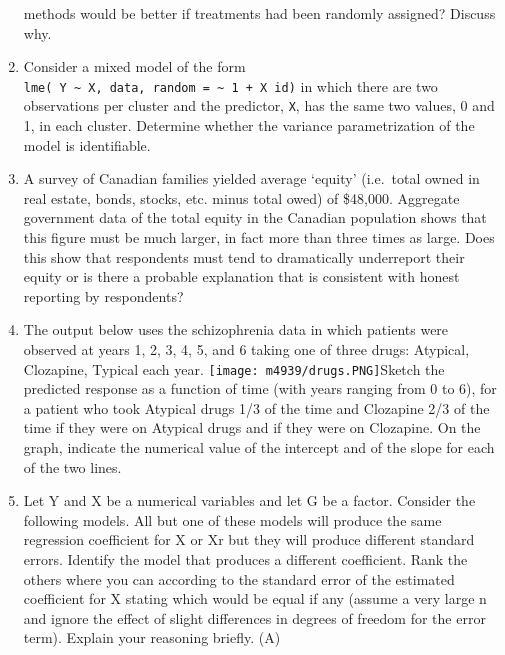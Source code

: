 \documentclass[
]{article}
\begin{document}
\begin{enumerate}
  methods would be better if treatments had been randomly assigned?
  Discuss why. \vspace{0px}
\item
  Consider a mixed model of the form
  \texttt{lme(\ Y\ \textasciitilde{}\ X,\ data,\ random\ =\ \textasciitilde{}\ 1\ +\ X\textbar{}\ id)}
  in which there are two observations per cluster and the predictor,
  \texttt{X}, has the same two values, 0 and 1, in each cluster.
  Determine whether the variance parametrization of the model is
  identifiable. \vspace{0px}
\item
  A survey of Canadian families yielded average `equity' (i.e.~total
  owned in real estate, bonds, stocks, etc. minus total owed) of
  \$48,000. Aggregate government data of the total equity in the
  Canadian population shows that this figure must be much larger, in
  fact more than three times as large. Does this show that respondents
  must tend to dramatically underreport their equity or is there a
  probable explanation that is consistent with honest reporting by
  respondents? \vspace{0px}
\item
  The output below uses the schizophrenia data in which patients were
  observed at years 1, 2, 3, 4, 5, and 6 taking one of three drugs:
  Atypical, Clozapine, Typical each year.
  \newline\nopagebreak \texttt{[image: m4939/drugs.PNG]}\newline\nopagebreak Sketch
  the predicted response as a function of time (with years ranging from
  0 to 6), for a patient who took Atypical drugs 1/3 of the time and
  Clozapine 2/3 of the time if they were on Atypical drugs and if they
  were on Clozapine. On the graph, indicate the numerical value of the
  intercept and of the slope for each of the two lines. \vspace{0px}
\item
  Let Y and X be a numerical variables and let G be a factor. Consider
  the following models. All but one of these models will produce the
  same regression coefficient for X or Xr but they will produce
  different standard errors. Identify the model that produces a
  different coefficient. Rank the others where you can according to the
  standard error of the estimated coefficient for X stating which would
  be equal if any (assume a very large n and ignore the effect of slight
  differences in degrees of freedom for the error term). Explain your
  reasoning briefly. \newline\newline \null\quad (A)

\end{enumerate}
\end{document}
